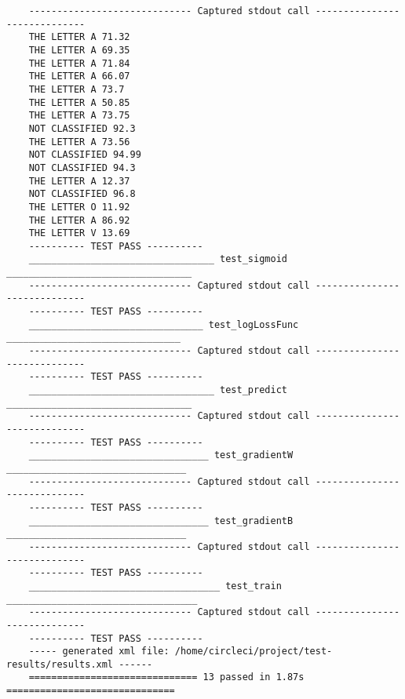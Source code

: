 \documentclass[12pt, titlepage]{article}
\begin{document}
\begin{small}
\begin{verbatim}
    ----------------------------- Captured stdout call -----------------------------
    THE LETTER A 71.32
    THE LETTER A 69.35
    THE LETTER A 71.84
    THE LETTER A 66.07
    THE LETTER A 73.7
    THE LETTER A 50.85
    THE LETTER A 73.75
    NOT CLASSIFIED 92.3
    THE LETTER A 73.56
    NOT CLASSIFIED 94.99
    NOT CLASSIFIED 94.3
    THE LETTER A 12.37
    NOT CLASSIFIED 96.8
    THE LETTER O 11.92
    THE LETTER A 86.92
    THE LETTER V 13.69
    ---------- TEST PASS ----------
    _________________________________ test_sigmoid _________________________________
    ----------------------------- Captured stdout call -----------------------------
    ---------- TEST PASS ----------
    _______________________________ test_logLossFunc _______________________________
    ----------------------------- Captured stdout call -----------------------------
    ---------- TEST PASS ----------
    _________________________________ test_predict _________________________________
    ----------------------------- Captured stdout call -----------------------------
    ---------- TEST PASS ----------
    ________________________________ test_gradientW ________________________________
    ----------------------------- Captured stdout call -----------------------------
    ---------- TEST PASS ----------
    ________________________________ test_gradientB ________________________________
    ----------------------------- Captured stdout call -----------------------------
    ---------- TEST PASS ----------
    __________________________________ test_train __________________________________
    ----------------------------- Captured stdout call -----------------------------
    ---------- TEST PASS ----------
    ----- generated xml file: /home/circleci/project/test-results/results.xml ------
    ============================== 13 passed in 1.87s ==============================
  \end{verbatim}
\end{small}
\end{document}

